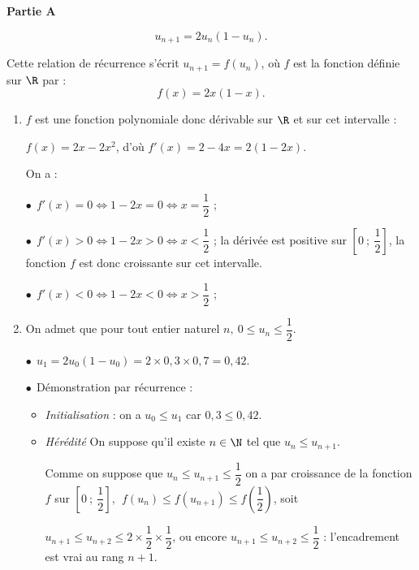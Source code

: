 
\medskip

\textbf{Partie A}

\medskip

\[u_{n+1} =  2u_n\left(1 - u_n\right).\]

Cette relation de récurrence s'écrit $u_{n+1} =  f\left(u_n\right)$, où $f$ est la fonction définie sur $\R$ par :
\[f(x) = 2x(1 - x).\]

\smallskip
\begin{enumerate}
\item %
$f$ est une fonction polynomiale donc dérivable sur $\R$ et sur cet intervalle :

$f(x) = 2x - 2x^2$, d'où $f'(x) = 2 - 4x = 2(1 - 2x)$.

On a :

$\bullet~~$$f'(x) = 0 \iff 1 - 2x = 0 \iff x = \dfrac12$ ;

$\bullet~~$$f'(x) > 0 \iff 1 - 2x > 0 \iff x < \dfrac12$ ; la dérivée est positive sur $\left[0~;~\dfrac12\right]$, la fonction $f$ est donc croissante sur cet intervalle.

$\bullet~~$$f'(x) < 0 \iff 1 - 2x < 0 \iff x > \dfrac12$ ;
\item On admet que pour tout entier naturel $n,\:0 \leqslant u_n \leqslant \dfrac12$.

$\bullet~~$$u_1 = 2u_0\left(1 - u_0\right) = 2\times 0,3 \times 0,7= 0,42$.

$\bullet~~$Démonstration par récurrence :

\begin{itemize}
\item \emph{Initialisation} : on a $u_0 \leqslant u_1$ car $0,3 \leqslant 0,42$.
\item \emph{Hérédité} On suppose qu'il existe $n \in \N$  tel que $u_n \leqslant u_{n+1}$.

Comme on suppose que $u_n \leqslant u_{n+1} \leqslant \dfrac12$ on a par croissance de la fonction $f$ sur $\left[0~;~\dfrac12\right], \: \:f\left(u_n\right) \leqslant f\left(u_{n+1}\right) \leqslant f\left(\dfrac12\right)$, soit 

$u_{n+1} \leqslant u_{n+2} \leqslant 2 \times \dfrac12 \times \dfrac12$, ou encore $u_{n+1} \leqslant u_{n+2} \leqslant \dfrac12$ : l'encadrement est vrai au rang $n+1$.


\end{itemize}
\end{enumerate}

